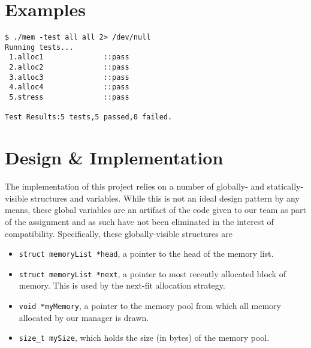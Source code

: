 \documentclass[paper=a4, fontsize=11pt]{scrartcl}
\begin{document}
\section*{Examples}
\begin{lstlisting}[style=ShellStyle]
$ ./mem -test all all 2> /dev/null
Running tests...
 1.alloc1              ::pass
 2.alloc2              ::pass
 3.alloc3              ::pass
 4.alloc4              ::pass
 5.stress              ::pass

Test Results:5 tests,5 passed,0 failed.
\end{lstlisting}

\section*{Design \& Implementation}
The implementation of this project relies on a number of globally- and statically-visible structures and variables. While this is not an ideal design pattern by any means, these global variables are an artifact of the code given to our team as part of the assignment and as such have not been eliminated in the interest of compatibility. Specifically, these globally-visible structures are

\begin{itemize}
  \item \texttt{struct memoryList *head}, a pointer to the head of the memory list.
  \item \texttt{struct memoryList *next}, a pointer to most recently allocated block of memory. This is used by the next-fit allocation strategy.
  \item \texttt{void *myMemory}, a pointer to the memory pool from which all memory allocated by our manager is drawn.
  \item \texttt{size\_t mySize}, which holds the size (in bytes) of the memory pool.
\end{itemize}
\end{document}
